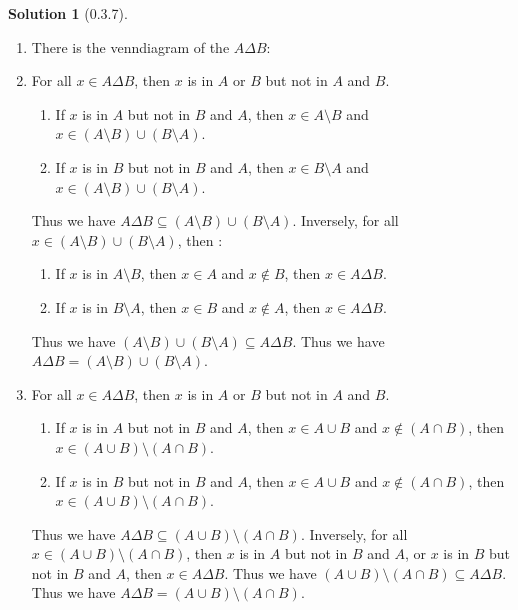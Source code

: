 \documentclass{article}
\theoremstyle{definition}
\newtheorem{sol}{Solution}[exe]
\begin{document}
\begin{sol}[0.3.7]
\begin{enumerate}
    \item There is the venndiagram of the $A\Delta B$:\\
    \item For all $x\in A\Delta B$, then $x$ is in $A$ or $B$ but not in $A$ and $B$.
    \begin{enumerate}[label=(\alph*)]
        \item If $x$ is in $A$ but not in $B$ and $A$, then $x\in A\setminus B$ and $x\in(A\setminus B)\cup (B\setminus A)$.
        \item If $x$ is in $B$ but not in $B$ and $A$, then $x\in B\setminus A$ and $x\in(A\setminus B)\cup (B\setminus A)$.
    \end{enumerate}
    Thus we have $A\Delta B\subseteq (A\setminus B)\cup (B\setminus A)$.
    Inversely, for all $x\in (A\setminus B)\cup (B\setminus A)$, then :
    \begin{enumerate}[label=(\alph*)]
        \item If $x$ is in $A\setminus B$, then $x\in A$ and $x\notin B$, then $x\in A\Delta B$.
        \item If $x$ is in $B\setminus A$, then $x\in B$ and $x\notin A$, then $x\in A\Delta B$.
    \end{enumerate}
    Thus we have $(A\setminus B)\cup (B\setminus A)\subseteq A\Delta B$.
    Thus we have $A\Delta B=(A\setminus B)\cup (B\setminus A)$.
    \item For all $x\in A\Delta B$, then $x$ is in $A$ or $B$ but not in $A$ and $B$.
    \begin{enumerate}[label=(\alph*)]
        \item If $x$ is in $A$ but not in $B$ and $A$, then $x\in A\cup B$ and $x\notin (A\cap B)$, then $x\in (A\cup B)\setminus (A\cap B)$.
        \item If $x$ is in $B$ but not in $B$ and $A$, then $x\in A\cup B$ and $x\notin (A\cap B)$, then $x\in (A\cup B)\setminus (A\cap B)$.
    \end{enumerate}
    Thus we have $A\Delta B\subseteq (A\cup B)\setminus (A\cap B)$.
    Inversely, for all $x\in (A\cup B)\setminus (A\cap B)$, then $x$ is in $A$ but not in $B$ and $A$, or 
    $x$ is in $B$ but not in $B$ and $A$, then $x\in A\Delta B$.
    Thus we have $(A\cup B)\setminus (A\cap B)\subseteq A\Delta B$.
    Thus we have $A\Delta B=(A\cup B)\setminus (A\cap B)$.

\end{enumerate}
\end{sol}
\end{document}
